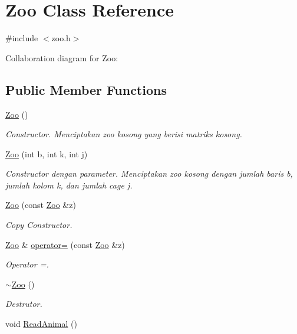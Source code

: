 \hypertarget{classZoo}{}\section{Zoo Class Reference}
\label{classZoo}


{\ttfamily \#include $<$zoo.\+h$>$}



Collaboration diagram for Zoo\+:
\subsection*{Public Member Functions}
\begin{DoxyCompactItemize}
\item 
\hyperlink{classZoo_aaa0bf87b544fccd087e471ee0913709c}{Zoo} ()
\begin{DoxyCompactList}\small\item\em Constructor. Menciptakan zoo kosong yang berisi matriks kosong. \end{DoxyCompactList}\item 
\hyperlink{classZoo_a1d2ee3cc08057d114174ad997632f604}{Zoo} (int b, int k, int j)
\begin{DoxyCompactList}\small\item\em Constructor dengan parameter. Menciptakan zoo kosong dengan jumlah baris b, jumlah kolom k, dan jumlah cage j. \end{DoxyCompactList}\item 
\hyperlink{classZoo_a891edf2fa47d023068058e3745964e18}{Zoo} (const \hyperlink{classZoo}{Zoo} \&z)
\begin{DoxyCompactList}\small\item\em Copy Constructor. \end{DoxyCompactList}\item 
\hyperlink{classZoo}{Zoo} \& \hyperlink{classZoo_a62df0863e76f6d75a837c0445326deb7}{operator=} (const \hyperlink{classZoo}{Zoo} \&z)
\begin{DoxyCompactList}\small\item\em Operator =. \end{DoxyCompactList}\item 
\hyperlink{classZoo_ab65ebe1fa60f6cf2a7cc55f78ff06ba5}{$\sim$\+Zoo} ()
\begin{DoxyCompactList}\small\item\em Destrutor. \end{DoxyCompactList}\item 
void \hyperlink{classZoo_a56db9c646afb72b7d277b6bea76e675c}{Read\+Animal} ()

\end{DoxyCompactItemize}
